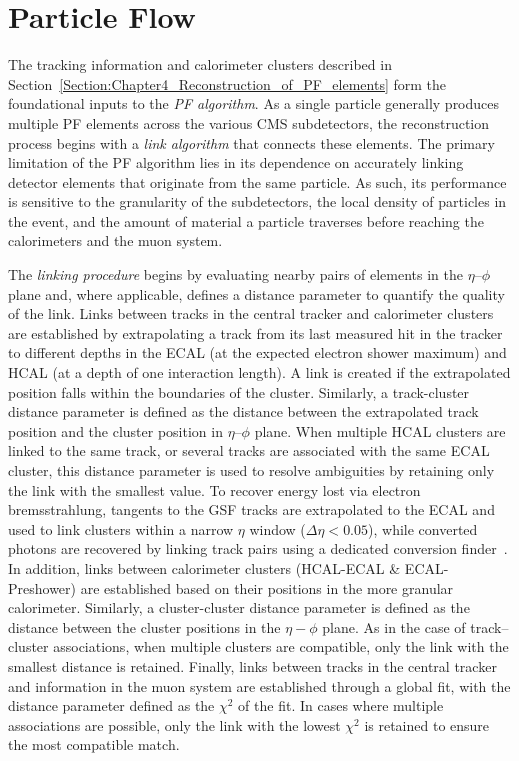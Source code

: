\section{Particle Flow}
The tracking information and calorimeter clusters described in Section~\ref{Section:Chapter4_Reconstruction_of_PF_elements} form the foundational inputs to the \textit{PF algorithm}. As a single particle generally produces multiple PF elements across the various \ac{CMS} subdetectors, the reconstruction process begins with a \textit{link algorithm} that connects these elements. The primary limitation of the PF algorithm lies in its dependence on accurately linking detector elements that originate from the same particle. As such, its performance is sensitive to the granularity of the subdetectors, the local density of particles in the event, and the amount of material a particle traverses before reaching the calorimeters and the muon system.

The \textit{linking procedure} begins by evaluating nearby pairs of elements in the $\eta$–$\phi$ plane and, where applicable, defines a distance parameter to quantify the quality of the link. Links between tracks in the central tracker and calorimeter clusters are established by extrapolating a track from its last measured hit in the tracker to different depths in the \ac{ECAL} (at the expected electron shower maximum) and \ac{HCAL} (at a depth of one interaction length). A link is created if the extrapolated position falls within the boundaries of the cluster. Similarly, a track-cluster distance parameter is defined as the distance between the extrapolated track position and the cluster position in $\eta$–$\phi$ plane. When multiple \ac{HCAL} clusters are linked to the same track, or several tracks are associated with the same \ac{ECAL} cluster, this distance parameter is used to resolve ambiguities by retaining only the link with the smallest value. To recover energy lost via electron bremsstrahlung, tangents to the GSF tracks are extrapolated to the \ac{ECAL} and used to link clusters within a narrow $\eta$ window ($\Delta\eta < 0.05$), while converted photons are recovered by linking track pairs using a dedicated conversion finder~\cite{DedicatedConversionFinder}. In addition, links between calorimeter clusters (\ac{HCAL}-\ac{ECAL} \& \ac{ECAL}-Preshower) are established based on their positions in the more granular calorimeter. Similarly, a cluster-cluster distance parameter is defined as the distance between the cluster positions in the $\eta-\phi$ plane. As in the case of track–cluster associations, when multiple clusters are compatible, only the link with the smallest distance is retained. Finally, links between tracks in the central tracker and information in the muon system are established through a global fit, with the distance parameter defined as the $\chi^2$ of the fit. In cases where multiple associations are possible, only the link with the lowest $\chi^2$ is retained to ensure the most compatible match.

